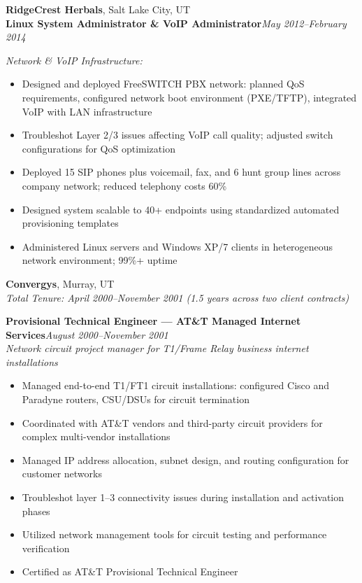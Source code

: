 \documentclass[9pt,letterpaper]{extarticle}
\begin{document}
\vspace{5pt}
\noindent\textbf{RidgeCrest Herbals}, Salt Lake City, UT\\
\textbf{Linux System Administrator \& VoIP Administrator}\hfill\textit{May 2012--February 2014}

\smallskip\textit{Network \& VoIP Infrastructure:}
\begin{itemize}
  \item Designed and deployed FreeSWITCH PBX network: planned QoS requirements, configured network boot environment (PXE/TFTP), integrated VoIP with LAN infrastructure
  \item Troubleshot Layer 2/3 issues affecting VoIP call quality; adjusted switch configurations for QoS optimization
  \item Deployed 15 SIP phones plus voicemail, fax, and 6 hunt group lines across company network; reduced telephony costs 60\%
  \item Designed system scalable to 40+ endpoints using standardized automated provisioning templates
  \item Administered Linux servers and Windows XP/7 clients in heterogeneous network environment; 99\%+ uptime
\end{itemize}

\vspace{5pt}
\noindent\textbf{Convergys}, Murray, UT\\
\textit{Total Tenure: April 2000--November 2001 (1.5 years across two client contracts)}

\smallskip\textbf{Provisional Technical Engineer --- AT\&T Managed Internet Services}\hfill\textit{August 2000--November 2001}\\
\textit{Network circuit project manager for T1/Frame Relay business internet installations}
\begin{itemize}
  \item Managed end-to-end T1/FT1 circuit installations: configured Cisco and Paradyne routers, CSU/DSUs for circuit termination
  \item Coordinated with AT\&T vendors and third-party circuit providers for complex multi-vendor installations
  \item Managed IP address allocation, subnet design, and routing configuration for customer networks
  \item Troubleshot layer 1--3 connectivity issues during installation and activation phases
  \item Utilized network management tools for circuit testing and performance verification
  \item Certified as AT\&T Provisional Technical Engineer
\end{itemize}
\end{document}
